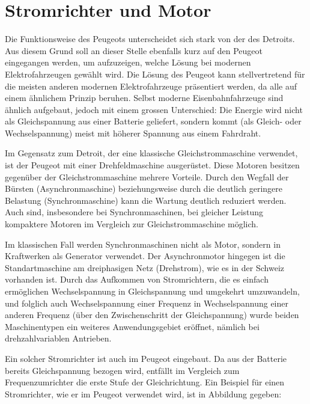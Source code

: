 \section{Stromrichter und Motor}
Die Funktionsweise des Peugeots unterscheidet sich stark von der des Detroits. Aus diesem Grund soll an dieser Stelle ebenfalls kurz auf den Peugeot eingegangen werden, um aufzuzeigen, welche Lösung bei modernen Elektrofahrzeugen gewählt wird. Die Lösung des Peugeot kann stellvertretend für die meisten anderen modernen Elektrofahrzeuge präsentiert werden, da alle auf einem ähnlichem Prinzip beruhen. Selbst moderne Eisenbahnfahrzeuge sind ähnlich aufgebaut, jedoch mit einem grossen Unterschied: Die Energie wird nicht als Gleichspannung aus einer Batterie geliefert, sondern kommt (als Gleich- oder Wechselspannung) meist mit höherer Spannung aus einem Fahrdraht.

Im Gegensatz zum Detroit, der eine klassische Gleichstrommaschine verwendet, ist der Peugeot mit einer Drehfeldmaschine ausgerüstet. Diese Motoren besitzen gegenüber der Gleichstrommaschine mehrere Vorteile. Durch den Wegfall der Bürsten (Asynchronmaschine) beziehungsweise durch die deutlich geringere Belastung (Synchronmaschine) kann die Wartung deutlich reduziert werden. Auch sind, insbesondere bei Synchronmaschinen, bei gleicher Leistung kompaktere Motoren im Vergleich zur Gleichstrommaschine möglich.

Im klassischen Fall werden Synchronmaschinen nicht als Motor, sondern in Kraftwerken als Generator verwendet. Der Asynchronmotor hingegen ist die Standartmaschine am dreiphasigen Netz (Drehstrom), wie es in der Schweiz vorhanden ist. Durch das Aufkommen von Stromrichtern, die es einfach ermöglichen Wechselspannung in Gleichspannung und umgekehrt umzuwandeln, und folglich auch Wechselspannung einer Frequenz in Wechselspannung einer anderen Frequenz (über den Zwischenschritt der Gleichspannung) wurde beiden Maschinentypen ein weiteres Anwendungsgebiet eröffnet, nämlich bei drehzahlvariablen Antrieben.

Ein solcher Stromrichter ist auch im Peugeot eingebaut. Da aus der Batterie bereits Gleichspannung bezogen wird, entfällt im Vergleich zum Frequenzumrichter die erste Stufe der Gleichrichtung. Ein Beispiel für einen Stromrichter, wie er im Peugeot verwendet wird, ist in Abbildung  gegeben:


